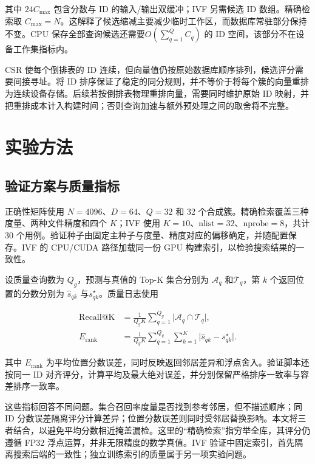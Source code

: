 \documentclass[UTF8,a4paper,zihao=5,fontset=none]{ctexart}
\begin{document}
其中 $24C_{\max}$ 包含分数与 ID 的输入/输出双缓冲；IVF 另需候选 ID 数组。精确检索取 $C_{\max}=N$。这解释了候选缩减主要减少临时工作区，而数据库常驻部分保持不变。CPU 保存全部查询候选还需要$O(\sum_{q=1}^{Q}C_q)$ 的 ID 空间，该部分不在设备工作集指标内。


CSR 使每个倒排表的 ID 连续，但向量值仍按原始数据库顺序排列，候选评分需要间接寻址。将 ID 排序保证了稳定的同分规则，并不等价于将每个簇的向量重排为连续设备存储。后续若按倒排表物理重排向量，需要同时维护原始 ID 映射，并把重排成本计入构建时间；否则查询加速与额外预处理之间的取舍将不完整。


\section{实验方法}

\subsection{验证方案与质量指标}

正确性矩阵使用 $N=4096$、$D=64$、$Q=32$ 和 32 个合成簇。精确检索覆盖三种度量、两种文件精度和四个 $K$；IVF 使用 $K=10$、$\mathrm{nlist}=32$、$\mathrm{nprobe}=8$，共计 30 个用例。验证种子由固定主种子与度量、精度对应的偏移确定，并随配置保存。IVF 的 CPU/CUDA 路径加载同一份 GPU 构建索引，以检验搜索结果的一致性。


设质量查询数为 $Q_g$，预测与真值的 Top-K 集合分别为 $\mathcal{A}_q$ 和$\mathcal{T}_q$，第 $k$ 个返回位置的分数分别为 $\widehat{s}_{qk}$ 与$s_{qk}^{\star}$。质量日志使用


\nopagebreak[4]
\begin{equation}
\label{eq:4}
\begin{aligned}
\mathrm{Recall@K}
  &=\frac{1}{Q_gK}\sum_{q=1}^{Q_g}
    \lvert\mathcal{A}_q\cap\mathcal{T}_q\rvert,\\
E_{\mathrm{rank}}
  &=\frac{1}{Q_gK}\sum_{q=1}^{Q_g}\sum_{k=1}^{K}
    \lvert\widehat{s}_{qk}-s_{qk}^{\star}\rvert.
\end{aligned}
\end{equation}

其中 $E_{\mathrm{rank}}$ 为平均位置分数误差，同时反映返回邻居差异和浮点舍入。验证脚本还按同一 ID 对齐评分，计算平均及最大绝对误差，并分别保留严格排序一致率与容差排序一致率。


这些指标回答不同问题。集合召回率度量是否找到参考邻居，但不描述顺序；同 ID 分数误差隔离评分计算差异；位置分数误差则同时受邻居替换影响。本文将三者结合，以避免平均分数相近掩盖漏检。这里的“精确检索”指穷举全库，其评分仍遵循 FP32 浮点运算，并非无限精度的数学真值。IVF 验证中固定索引，首先隔离搜索后端的一致性；独立训练索引的质量属于另一项实验问题。
\end{document}
